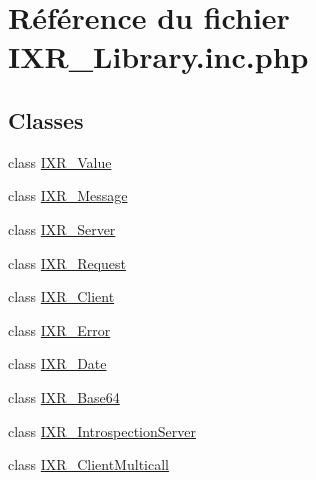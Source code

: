 \hypertarget{IXR__Library_8inc_8php}{
\section{R\'{e}f\'{e}rence du fichier IXR\_\-Library.inc.php}
\label{IXR__Library_8inc_8php}
}
\subsection*{Classes}
\begin{CompactItemize}
\item 
class \hyperlink{classIXR__Value}{IXR\_\-Value}
\item 
class \hyperlink{classIXR__Message}{IXR\_\-Message}
\item 
class \hyperlink{classIXR__Server}{IXR\_\-Server}
\item 
class \hyperlink{classIXR__Request}{IXR\_\-Request}
\item 
class \hyperlink{classIXR__Client}{IXR\_\-Client}
\item 
class \hyperlink{classIXR__Error}{IXR\_\-Error}
\item 
class \hyperlink{classIXR__Date}{IXR\_\-Date}
\item 
class \hyperlink{classIXR__Base64}{IXR\_\-Base64}
\item 
class \hyperlink{classIXR__IntrospectionServer}{IXR\_\-Introspection\-Server}
\item 
class \hyperlink{classIXR__ClientMulticall}{IXR\_\-Client\-Multicall}
\end{CompactItemize}
